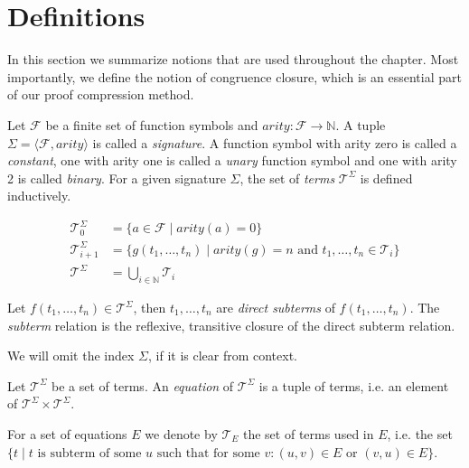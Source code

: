 \section{Definitions}
\label{sec:congruencedef}

In this section we summarize notions that are used throughout the chapter.
Most importantly, we define the notion of congruence closure, which is an essential part of our proof compression method.

\begin{definition}

Let $\mathcal{F}$ be a finite set of function symbols and $arity: \mathcal{F} \rightarrow \mathbb{N}$.
A tuple $\Sigma = \langle \mathcal{F}, arity \rangle$ is called a \emph{signature}.
A function symbol with arity zero is called a \emph{constant}, one with arity one is called a \emph{unary} function symbol and one with arity 2 is called \emph{binary}.
For a given signature $\Sigma$, the set of \emph{terms} $\mathcal{T}^{\Sigma}$ is defined inductively.

\begin{align*}
	\mathcal{T}^{\Sigma}_0 &= \{a \in \mathcal{F} \mid arity(a) = 0\}\\
	\mathcal{T}^{\Sigma}_{i+1} &= \{g(t_1,\ldots,t_n) \mid arity(g) = n \text{ and } t_1, \ldots, t_n \in \mathcal{T}_{i}\} \\
	\mathcal{T}^{\Sigma} &= \bigcup_{i\in \mathbb{N}} \mathcal{T}_{i}
\end{align*}

\noindent Let $f(t_1,\ldots,t_n) \in \mathcal{T}^{\Sigma}$, then $t_1,\ldots,t_n$ are \emph{direct subterms} of $f(t_1,\ldots,t_n)$.
The \emph{subterm} relation is the reflexive, transitive closure of the direct subterm relation.

\end{definition}

We will omit the index $\Sigma$, if it is clear from context.

\begin{definition}[Equation]

Let $\mathcal{T}^{\Sigma}$ be a set of terms.
An \emph{equation} of $\mathcal{T}^{\Sigma}$ is a tuple of terms, i.e. an element of $\mathcal{T}^{\Sigma} \times \mathcal{T}^{\Sigma}$.

\end{definition}

For a set of equations $E$ we denote by $\mathcal{T}_E$ the set of terms used in $E$, i.e. the set $\{t \mid t \text{ is subterm of some } u \text{ such that for some } v: (u,v) \in E \text{ or } (v,u) \in E\}$.

